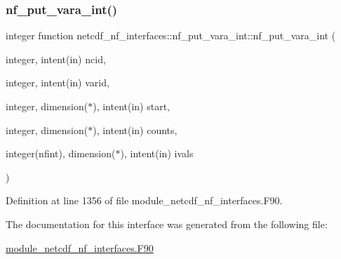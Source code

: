 \subsubsection{\texorpdfstring{nf\+\_\+put\+\_\+vara\+\_\+int()}{nf\_put\_vara\_int()}}
{\footnotesize\ttfamily integer function netcdf\+\_\+nf\+\_\+interfaces\+::nf\+\_\+put\+\_\+vara\+\_\+int\+::nf\+\_\+put\+\_\+vara\+\_\+int (\begin{DoxyParamCaption}\item[{integer, intent(in)}]{ncid,  }\item[{integer, intent(in)}]{varid,  }\item[{integer, dimension($\ast$), intent(in)}]{start,  }\item[{integer, dimension($\ast$), intent(in)}]{counts,  }\item[{integer(nfint), dimension($\ast$), intent(in)}]{ivals }\end{DoxyParamCaption})}



Definition at line 1356 of file module\+\_\+netcdf\+\_\+nf\+\_\+interfaces.\+F90.



The documentation for this interface was generated from the following file\+:\begin{DoxyCompactItemize}
\item 
\hyperlink{module__netcdf__nf__interfaces_8F90}{module\+\_\+netcdf\+\_\+nf\+\_\+interfaces.\+F90}\end{DoxyCompactItemize}
